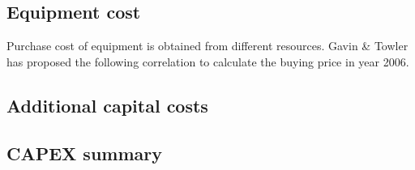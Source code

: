 \subsection{Equipment cost}
Purchase cost of equipment is obtained from different resources. Gavin & Towler has proposed the following correlation to calculate the buying price in year 2006.






\subsection{Additional capital costs}
\subsection{CAPEX summary}
